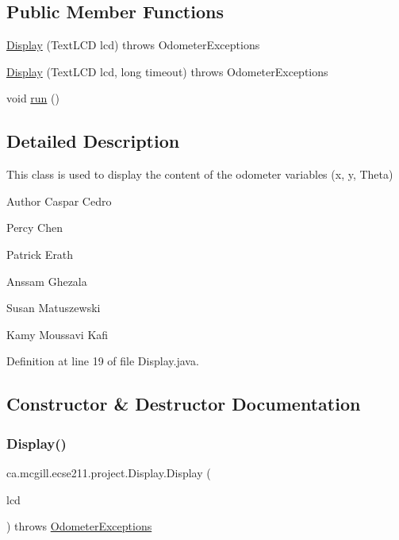 \subsection*{Public Member Functions}
\begin{DoxyCompactItemize}
\item 
\hyperlink{classca_1_1mcgill_1_1ecse211_1_1project_1_1_display_af0970123ca090749bfb2f5b9f478c01d}{Display} (Text\+L\+CD lcd)  throws Odometer\+Exceptions 
\item 
\hyperlink{classca_1_1mcgill_1_1ecse211_1_1project_1_1_display_a690cd91bcc8024950c2b8e3b2613c801}{Display} (Text\+L\+CD lcd, long timeout)  throws Odometer\+Exceptions 
\item 
void \hyperlink{classca_1_1mcgill_1_1ecse211_1_1project_1_1_display_ab508a8bc2b738499bec2c432a814cba5}{run} ()
\end{DoxyCompactItemize}


\subsection{Detailed Description}
This class is used to display the content of the odometer variables (x, y, Theta)

\begin{DoxyAuthor}{Author}
Caspar Cedro 

Percy Chen 

Patrick Erath 

Anssam Ghezala 

Susan Matuszewski 

Kamy Moussavi Kafi 
\end{DoxyAuthor}


Definition at line 19 of file Display.\+java.



\subsection{Constructor \& Destructor Documentation}
\mbox{\label{classca_1_1mcgill_1_1ecse211_1_1project_1_1_display_af0970123ca090749bfb2f5b9f478c01d}} 
\subsubsection{\texorpdfstring{Display()}{Display()}\hspace{0.1cm}{\footnotesize\ttfamily [1/2]}}
{\footnotesize\ttfamily ca.\+mcgill.\+ecse211.\+project.\+Display.\+Display (\begin{DoxyParamCaption}\item[{Text\+L\+CD}]{lcd }\end{DoxyParamCaption}) throws \hyperlink{classca_1_1mcgill_1_1ecse211_1_1odometer_1_1_odometer_exceptions}{Odometer\+Exceptions}}

